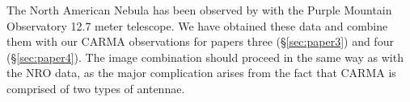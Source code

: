 The North American Nebula has been observed by \citet{Zhang14} with the Purple Mountain Observatory 12.7 meter telescope. We have obtained these data and combine them with our CARMA observations for papers three (\S\ref{sec:paper3}) and four (\S\ref{sec:paper4}). The image combination should proceed in the same way as with the NRO data, as the major complication arises from the fact that CARMA is comprised of two types of antennae.

    
    
